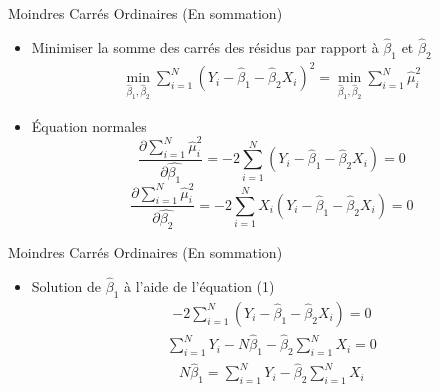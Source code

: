 \documentclass{beamer}
\begin{document}
\begin{frame}{Moindres Carrés Ordinaires (En sommation)}
\begin{itemize}
\item Minimiser la somme des carrés des résidus par rapport à $\hat{\beta}_1$ et $\hat{\beta}_2$
\begin{align*}
\min_{\hat{\beta}_1,\hat{\beta}_2} \sum_{i=1}^{N}(Y_i-\hat{\beta}_1-\hat{\beta}_2 X_i)^2=\min_{\hat{\beta}_1,\hat{\beta}_2} \sum_{i=1}^{N} \hat{\mu}_i^2
\end{align*}
\item Équation normales 
\begin{equation}
\frac{\partial \sum_{i=1}^{N} \hat{\mu}_i^2}{\partial \hat{\beta_1}}=-2\sum_{i=1}^N(Y_i-\hat{\beta}_1-\hat{\beta}_2 X_i)=0
\end{equation}
\begin{equation}
\frac{\partial \sum_{i=1}^{N} \hat{\mu}_i^2}{\partial \hat{\beta_2}}=-2\sum_{i=1}^NX_i(Y_i-\hat{\beta}_1-\hat{\beta}_2 X_i)=0
\end{equation}
\end{itemize}
\end{frame}

\begin{frame}{Moindres Carrés Ordinaires (En sommation)}
\begin{itemize}
\item Solution de $\hat{\beta}_1$ à l'aide de l'équation (1)
\begin{align*}
-2\sum_{i=1}^N(Y_i-\hat{\beta}_1-\hat{\beta}_2 X_i)=0
\end{align*}
\begin{align*}
\sum_{i=1}^N Y_i - N\hat{\beta}_1-\hat{\beta}_2 \sum_{i=1}^N X_i=0
\end{align*}
\begin{align*}
N\hat{\beta}_1=\sum_{i=1}^N Y_i - \hat{\beta}_2 \sum_{i=1}^N X_i
\end{align*}
\end{itemize}
\end{frame}
\end{document}
